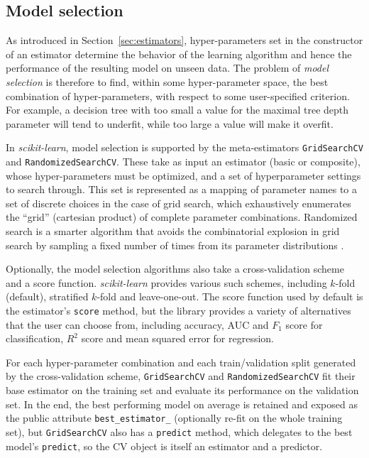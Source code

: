 \documentclass[twocolumn]{article}
\newcommand{\sklearn}{\textit{scikit-learn}\xspace}
\begin{document}
\subsection{Model selection}

As introduced in Section~\ref{sec:estimators}, hyper-parameters set in the
constructor of an estimator
determine the behavior of the learning algorithm
and hence the performance of the resulting model on unseen data.
The problem of \textit{model selection} is therefore to find, within
some hyper-parameter space, the best combination of hyper-parameters, with
respect to some user-specified criterion. For example, a decision
tree with too small a value for the maximal tree depth
parameter will tend to underfit, while too large a value will make it overfit.

In \sklearn, model selection is supported by the meta-estimators
\texttt{GridSearchCV} and \texttt{RandomizedSearchCV}.  These take as input an
estimator (basic or composite), whose hyper-parameters must be optimized, and a
set of hyperparameter settings to search through.
This set is represented as a mapping of parameter names
to a set of discrete choices in the case of grid search,
which exhaustively enumerates the ``grid'' (cartesian product)
of complete parameter combinations.
Randomized search is a smarter algorithm
that avoids the combinatorial explosion in grid search
by sampling a fixed number of times from its parameter distributions
\citep{bergstra2012}.

Optionally, the model selection algorithms
also take a cross-validation scheme and a score function.  \sklearn provides
various such schemes, including $k$-fold (default),
stratified $k$-fold and leave-one-out.
The score function used by default is the estimator's \texttt{score} method,
but the library provides a variety of
alternatives that the user can choose from,
including accuracy, AUC and $F_1$ score for classification,
$R^2$ score and mean squared error for regression.

For each hyper-parameter combination and each train/validation split
generated by the cross-validation scheme, \texttt{GridSearchCV}
and \texttt{RandomizedSearchCV} fit their base estimator on the training set and
evaluate its performance on the validation set.  In the end, the best performing
model on average is retained and exposed as the public attribute
\texttt{best\_estimator\_} (optionally re-fit on the whole training set),
but \texttt{GridSearchCV} also has a \texttt{predict} method,
which delegates to the best model's \texttt{predict},
so the CV object is itself an estimator and a predictor.
\end{document}
